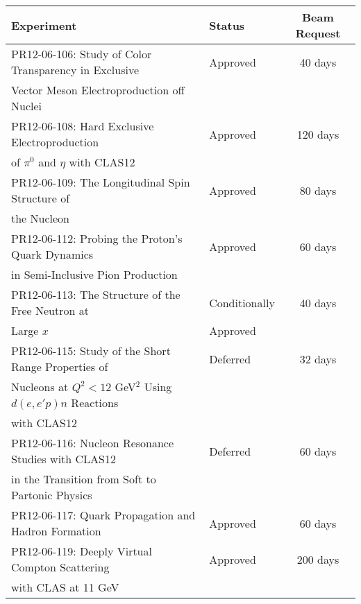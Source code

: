 \begin{table}[htbp]
\begin{center}
\begin{tabular} {||l|l|c|} \hline \hline
Experiment & Status & Beam Request \\ \hline
PR12-06-106: Study of Color Transparency in Exclusive     & Approved      & 40 days  \\
Vector Meson Electroproduction off Nuclei                 &               &          \\ \hline
PR12-06-108: Hard Exclusive Electroproduction             & Approved      & 120 days \\
of $\pi^0$ and $\eta$ with CLAS12                         &               &          \\ \hline
PR12-06-109: The Longitudinal Spin Structure of           & Approved      & 80 days  \\
the Nucleon                                               &               &          \\ \hline
PR12-06-112: Probing the Proton's Quark Dynamics          & Approved      & 60 days  \\
in Semi-Inclusive Pion Production                         &               &          \\ \hline
PR12-06-113: The Structure of the Free Neutron at         & Conditionally & 40 days  \\
Large $x$                                                 & Approved      &          \\ \hline
PR12-06-115: Study of the Short Range Properties of       & Deferred      & 32 days  \\
Nucleons at $Q^2 < 12$ GeV$^2$ Using $d(e,e'p)n$ Reactions&               &          \\
with CLAS12                                               &               &          \\ \hline
PR12-06-116: Nucleon Resonance Studies with CLAS12        & Deferred      & 60 days  \\
in the Transition from Soft to Partonic Physics           &               &          \\ \hline
PR12-06-117: Quark Propagation and Hadron Formation       & Approved      & 60 days  \\ \hline
PR12-06-119: Deeply Virtual Compton Scattering            & Approved      & 200 days \\
with CLAS at 11 GeV                                       &               &          \\ \hline

\end{tabular}
\end{center}
\end{table}
